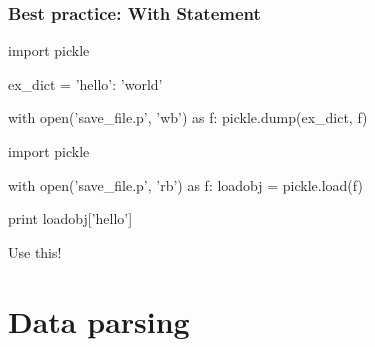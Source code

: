 \documentclass[xcolor=table,10pt]{beamer}
\begin{document}
\begin{frame}[fragile]
  \frametitle{Best practice: With Statement}


  \begin{mlinepython}
    import pickle 

    ex_dict = {'hello': 'world'}

    with open('save_file.p', 'wb') as f:
        pickle.dump(ex_dict, f)
  \end{mlinepython}

  \bigskip \pause
  \vspace{0.2cm}

  \begin{mlinepython}
    import pickle 

    with open('save_file.p', 'rb') as f:
        loadobj = pickle.load(f)

    print loadobj['hello']
  \end{mlinepython}
  \vspace{0.15cm}
  \begin{arrowlist}
  \item Use this!
  \end{arrowlist}

\end{frame}
















\section{Data parsing}
\end{document}
